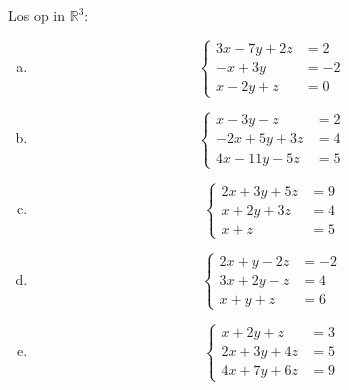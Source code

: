 \documentclass[12pt,twoside]{article}
\begin{document}
\begin{oefening}
Los op in $\mathbb{R}^3$:
\begin{multicols}{2}
\begin{enumerate}[(a)]
  \item$$\left\{
    \begin{aligned}
      3x - 7y + 2z &= 2\\
      -x + 3y      &= -2\\
      x  - 2y +  z &= 0
    \end{aligned}\right.$$
  \item$$\left\{
    \begin{aligned}
        x - 3y -  z &= 2\\
      -2x + 5y + 3z &= 4\\
       4x -11y - 5z &= 5
    \end{aligned}\right.$$
  \item$$\left\{
    \begin{aligned}
      2x + 3y + 5z &= 9\\
       x + 2y + 3z &= 4\\
       x +  z &= 5
    \end{aligned}\right.$$
  \item$$\left\{
    \begin{aligned}
      2x +  y - 2z &= -2\\
      3x + 2y -  z &=  4\\
       x +  y +  z &=  6
    \end{aligned}\right.$$
  \item$$\left\{
    \begin{aligned}
       x + 2y +  z &= 3\\
      2x + 3y + 4z &= 5\\
      4x + 7y + 6z &= 9
    \end{aligned}\right.$$
\end{enumerate}
\end{multicols}
\end{oefening}
\end{document}
